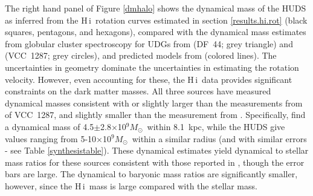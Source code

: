 \documentclass[twocolumn]{aastex6}
\newcommand{\msun}{M_{\odot}}
\def\msun{$M_\odot$}
\newcommand{\hi}{H{\sc\,i}}
\begin{document}
The right hand panel of Figure \ref{dmhalo} shows the dynamical mass of the HUDS as inferred from the \hi\ rotation curves estimated in section \ref{results.hi.rot} (black squares, pentagons, and hexagons), compared with the dynamical mass estimates from globular cluster spectroscopy for UDGs from \cite{vandokkum16a} (DF~44; grey triangle) and \cite{beasley16a} (VCC~1287; grey circles), and predicted models from \cite{dicintio16a} (colored lines). The uncertainties in geometry dominate the uncertainties in estimating the rotation velocity. However, even accounting for these, the \hi\ data provides significant constraints on the dark matter masses. All three sources have measured dynamical masses consistent with or slightly larger than the measurements from \cite{beasley16a} of VCC~1287, and slightly smaller than the measurement from \cite{vandokkum16a}. Specifically, \cite{beasley16a} find a
dynamical mass of 4.5$\pm$2.8$\times$10$^9$\msun\ within 8.1~kpc, while the HUDS give values ranging from 5-10$\times$10$^9$\msun\ within a similar radius (and with similar errors - see Table \ref{synthesistable}).
These dynamical estimates yield dynamical to stellar mass ratios for these sources consistent with those reported in \cite{beasley16a}, though the error bars are large. The dynamical to baryonic mass ratios are significantly smaller, however, since the \hi\ mass is large compared with the stellar mass.
\end{document}
